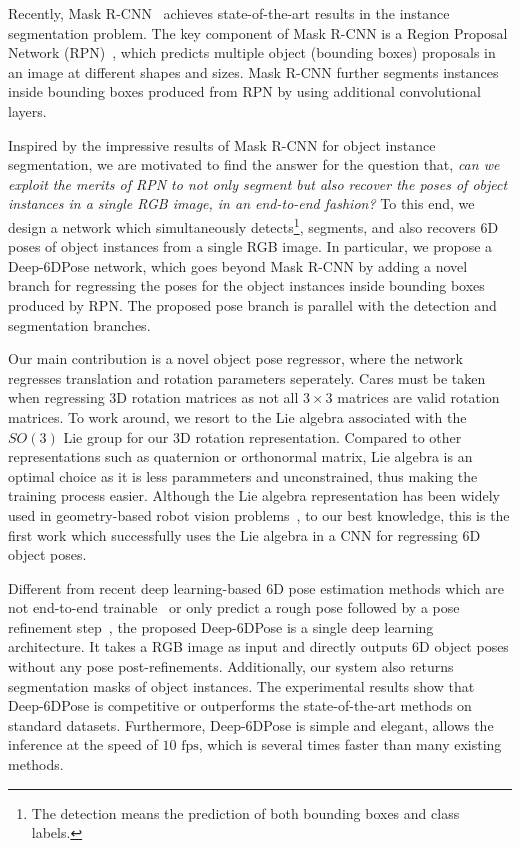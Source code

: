 \documentclass[conference]{IEEEtran}
\newcommand{\method}[1]{Deep-6DPose}
\begin{document}
Recently, Mask R-CNN~\cite{Mask-RCNN} achieves state-of-the-art results in the instance segmentation problem. The key component of Mask R-CNN is a Region Proposal Network (RPN)~\cite{Faster-RCNN}, which predicts multiple object (bounding boxes) proposals in an image at different shapes and sizes. 
Mask R-CNN further segments instances inside bounding boxes produced from RPN by using additional convolutional layers. 

Inspired by the impressive results of Mask R-CNN for object instance segmentation, 
we are motivated to find the answer for the question that, \textit{can we exploit the merits of RPN to not only segment but also recover the poses of object instances in a single RGB image, in an end-to-end fashion?}
To this end, we design a network which simultaneously detects\footnote{The detection means the prediction of both bounding boxes and class labels.}, segments, and also recovers 6D poses of object instances from a single RGB image. In particular, we propose a \method{} network, which goes beyond Mask R-CNN by adding a novel branch for regressing the poses for the object instances inside bounding boxes produced by RPN. The proposed pose branch is parallel with the detection and segmentation branches. 

Our main contribution is a novel object pose regressor, where the network regresses translation and rotation parameters seperately. Cares must be taken when regressing 3D rotation matrices as not all $3\times3$ matrices are valid rotation matrices. To work around, we resort to the Lie algebra associated with the $SO(3)$ Lie group for our 3D rotation representation. Compared to other representations such as quaternion or orthonormal matrix, Lie algebra is an optimal choice as it is less parammeters and unconstrained, thus making the training process easier. Although the Lie algebra representation has been widely used in geometry-based robot vision problems~\cite{DBLP:conf/iros/Agrawal06,DBLP:conf/icra/RosGSPL13}, to our best knowledge, this is the first work which successfully uses the Lie algebra in a CNN for regressing 6D object poses.


Different from recent deep learning-based 6D pose estimation methods which are not end-to-end trainable~\cite{BB8} or only predict a rough pose followed by a pose refinement step~\cite{SSD-6D,BB8,posecnn}, the proposed \method{} is a single deep learning architecture. It takes a RGB image as input and directly outputs 6D object poses without any pose post-refinements. Additionally, our system also returns segmentation masks of object instances. The experimental results show that \method{} is competitive or outperforms the state-of-the-art methods on standard datasets. Furthermore, \method{} is simple and elegant, allows the inference at the speed of $\textrm{10 fps}$, which is several times faster than many existing methods.
\end{document}
